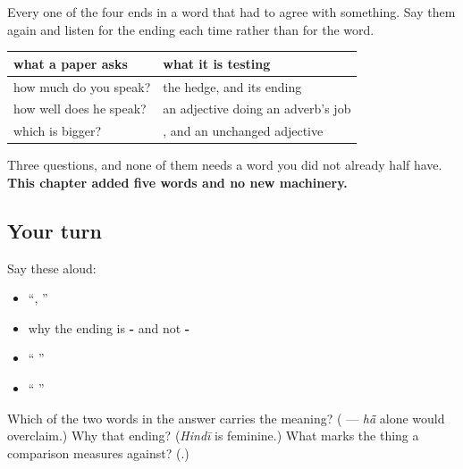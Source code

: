 Every one of the four ends in a word that had to agree with something. Say them again and listen for the ending each time rather than for the word.

\begin{grammarlens}[title={Grammar Lens: the chapter in one sentence}]
\noindent
\begin{tabularx}{\linewidth}{@{}>{\raggedright\arraybackslash}X>{\raggedright\arraybackslash}X@{}}
\toprule
\textbf{what a paper asks} & \textbf{what it is testing} \\
\midrule
how much do you speak? & the hedge, and its ending \\
how well does he speak? & an adjective doing an adverb's job \\
which is bigger? & \textbf{\hi{से}}, and an unchanged adjective \\
\bottomrule
\end{tabularx}

Three questions, and none of them needs a word you did not already half have. \textbf{This chapter added five words and no new machinery.}
\end{grammarlens}

\subsection*{Your turn}
Say these aloud:

\begin{itemize}
\raggedright
  \item \textquotedblleft{}, \textquotedblright{}
  \item why the ending is \textbf{-} and not \textbf{-}
  \item \textquotedblleft{}   \textquotedblright{}
  \item \textquotedblleft{}    \textquotedblright{}
\end{itemize}

\begin{tcolorbox}[breakable,colback=teal!4,colframe=teal!35!black,title={Before you move on}]
Which of the two words in the answer carries the meaning? (\textbf{} — \emph{hā̃} alone would overclaim.) Why that ending? (\emph{Hindī} is feminine.) What marks the thing a comparison measures against? (\textbf{}.)
\end{tcolorbox}
